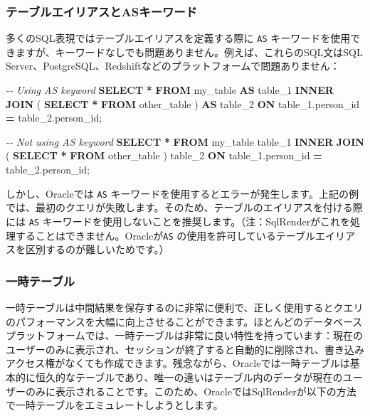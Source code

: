 \documentclass[
  11pt]{book}
\newenvironment{Shaded}{\begin{snugshade}}{\end{snugshade}}
\newcommand{\CommentTok}[1]{\textcolor[rgb]{0.56,0.35,0.01}{\textit{#1}}}
\newcommand{\KeywordTok}[1]{\textcolor[rgb]{0.13,0.29,0.53}{\textbf{#1}}}
\newcommand{\NormalTok}[1]{#1}
\newcommand{\OperatorTok}[1]{\textcolor[rgb]{0.81,0.36,0.00}{\textbf{#1}}}
\theoremstyle{definition}
\theoremstyle{definition}
\theoremstyle{definition}
\theoremstyle{definition}
\theoremstyle{remark}
\begin{document}
\subsubsection*{テーブルエイリアスとASキーワード}\label{ux30c6ux30fcux30d6ux30ebux30a8ux30a4ux30eaux30a2ux30b9ux3068asux30adux30fcux30efux30fcux30c9}

多くのSQL表現ではテーブルエイリアスを定義する際に \texttt{AS} キーワードを使用できますが、キーワードなしでも問題ありません。例えば、これらのSQL文はSQL Server、PostgreSQL、Redshiftなどのプラットフォームで問題ありません：

\begin{Shaded}
\begin{Highlighting}[]
\CommentTok{{-}{-} Using AS keyword}
\KeywordTok{SELECT} \OperatorTok{*}
\KeywordTok{FROM}\NormalTok{ my\_table }\KeywordTok{AS}\NormalTok{ table\_1}
\KeywordTok{INNER} \KeywordTok{JOIN}\NormalTok{ (}
  \KeywordTok{SELECT} \OperatorTok{*} \KeywordTok{FROM}\NormalTok{ other\_table}
\NormalTok{) }\KeywordTok{AS}\NormalTok{ table\_2}
\KeywordTok{ON}\NormalTok{ table\_1.person\_id }\OperatorTok{=}\NormalTok{ table\_2.person\_id;}

\CommentTok{{-}{-} Not using AS keyword}
\KeywordTok{SELECT} \OperatorTok{*}
\KeywordTok{FROM}\NormalTok{ my\_table table\_1}
\KeywordTok{INNER} \KeywordTok{JOIN}\NormalTok{ (}
  \KeywordTok{SELECT} \OperatorTok{*} \KeywordTok{FROM}\NormalTok{ other\_table}
\NormalTok{) table\_2}
\KeywordTok{ON}\NormalTok{ table\_1.person\_id }\OperatorTok{=}\NormalTok{ table\_2.person\_id;}
\end{Highlighting}
\end{Shaded}

しかし、Oracleでは \texttt{AS} キーワードを使用するとエラーが発生します。上記の例では、最初のクエリが失敗します。そのため、テーブルのエイリアスを付ける際には \texttt{AS} キーワードを使用しないことを推奨します。（注：SqlRenderがこれを処理することはできません。Oracleが\texttt{AS} の使用を許可しているテーブルエイリアスを区別するのが難しいためです。）

\subsubsection*{一時テーブル}\label{ux4e00ux6642ux30c6ux30fcux30d6ux30eb}

一時テーブルは中間結果を保存するのに非常に便利で、正しく使用するとクエリのパフォーマンスを大幅に向上させることができます。ほとんどのデータベースプラットフォームでは、一時テーブルは非常に良い特性を持っています：現在のユーザーのみに表示され、セッションが終了すると自動的に削除され、書き込みアクセス権がなくても作成できます。残念ながら、Oracleでは一時テーブルは基本的に恒久的なテーブルであり、唯一の違いはテーブル内のデータが現在のユーザーのみに表示されることです。このため、OracleではSqlRenderが以下の方法で一時テーブルをエミュレートしようとします。
\end{document}
